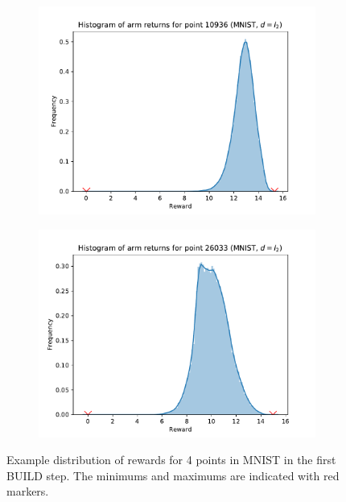 \begin{figure}[ht]
\begin{subfigure}{.5\textwidth}
  \includegraphics[width=\linewidth]{figures/sigma-MNIST-2-L2.pdf}   
\end{subfigure}
\begin{subfigure}{.5\textwidth}
  \centering
  \includegraphics[width=\linewidth]{figures/sigma-MNIST-3-L2.pdf}   
\end{subfigure}
\caption{Example distribution of rewards for 4 points in MNIST in the first BUILD step. The minimums and maximums are indicated with red markers.}
\label{fig:sigma_ex_MNIST}
\end{figure}


